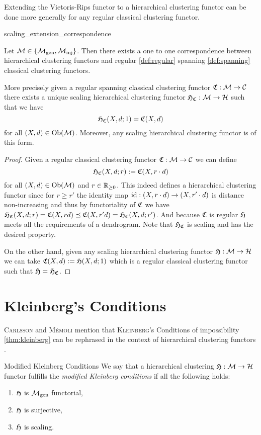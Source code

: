 Extending the Vietoris-Rips functor to a hierarchical clustering functor can be done more generally for any regular classical clustering functor.
\begin{proposition}{}{scaling_extension_correspondence}

Let $\mathcal{M} \in \{{\mathcal{M}_\mathrm{gen}},{\mathcal{M}_\mathrm{inj}}\}$. Then there exists a one to one correspondence between
hierarchical clustering functors and regular \ref{def:regular} spanning \ref{def:spanning} classical clustering functors.

\medskip
More precisely given a regular spanning classical clustering functor $\mathfrak{C}: \mathcal{M} \to \mathcal{C}$ there exists a unique scaling hierarchical clustering functor $\mathfrak{H}_{\mathfrak{C}}: \mathcal{M} \to \mathcal{H}$ such that we have
$$
\mathfrak{H}_{\mathfrak{C}}(X,d; 1) = \mathfrak{C}(X,d)
$$
for all $(X,d) \in \mathrm {Ob}(\mathcal{M})$.
Moreover, any scaling hierarchical clustering functor is of this form.
\end{proposition}

\begin{proof}
Given a regular classical clustering functor $\mathfrak{C}: \mathcal{M} \to \mathcal{C}$ we can define
$$
\mathfrak{H}_{\mathfrak{C}}(X,d; r) := \mathfrak{C}(X, r \cdot d)
$$
for all $(X,d) \in \mathrm {Ob}(\mathcal{M})$ and $r \in \mathbb R_{\geq0}$.
This indeed defines a hierarchical clustering functor since for $r \geq r'$ the identity map $\mathrm{id}: (X, r \cdot d) \to (X, r' \cdot d)$ is distance non-increasing and thus by functoriality of $\mathfrak{C}$ we have $\mathfrak{H}_{\mathfrak{C}}(X,d;r) = \mathfrak{C}(X, r d) \preceq \mathfrak{C}(X, r' d) = \mathfrak{H}_{\mathfrak{C}}(X,d;r')$. And because $\mathfrak{C}$ is regular $\mathfrak{H}$ meets all the requirements of a dendrogram. Note that $\mathfrak{H}_{\mathfrak{C}}$ is scaling and has the desired property.


On the other hand, given any scaling hierarchical clustering functor $\mathfrak{H}: \mathcal{M} \to \mathcal{H}$ we can take $\mathfrak{C}(X,d) := \mathfrak{H}(X,d; 1)$ which is a regular classical clustering functor such that $\mathfrak{H} = \mathfrak{H}_{\mathfrak{C}}$.
\end{proof}

\section{Kleinberg's Conditions}

\textsc{Carlsson} and \textsc{M\'emoli} mention that \textsc{Kleinberg}'s Conditions of impossibility \ref{thm:kleinberg} can be rephrased in the context of hierarchical clustering functors \cite[Sec.~7.3.1]{Carlsson2010}.

\begin{definition}{Modified Kleinberg Conditions \cite[Sec.~7.3.1]{Carlsson2010}}{}
    We say that a hierarchical clustering $\mathfrak{H}: \mathcal{M} \to \mathcal{H}$ functor fulfills the \emph{modified Kleinberg conditions} if all the following holds:
    \begin{enumerate}
        \item $\mathfrak{H}$ is ${\mathcal{M}_\mathrm{gen}}$ functorial,
        \item $\mathfrak{H}$ is surjective,
        \item $\mathfrak{H}$ is scaling.
    \end{enumerate}
\end{definition}

